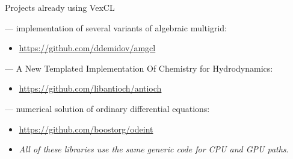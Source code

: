 \documentclass[@BEAMER_OPTIONS@]{beamer}
\begin{document}
\begin{frame}{Projects already using VexCL}
    \begin{description}[\quad]
        \item[AMGCL] --- implementation of several variants of algebraic
            multigrid:
            \begin{itemize}
                \item \href{https://github.com/ddemidov/amgcl}{https://github.com/ddemidov/amgcl}
            \end{itemize}
            \vspace{\baselineskip}
        \item[Antioch] --- A New Templated Implementation Of Chemistry for
            Hydrodynamics:
            \begin{itemize}
                \item \href{https://github.com/libantioch/antioch}{https://github.com/libantioch/antioch}
            \end{itemize}
            \vspace{\baselineskip}
        \item[Boost.odeint] --- numerical solution of ordinary differential
            equations:
            \begin{itemize}
                \item \href{https://github.com/boostorg/odeint}{https://github.com/boostorg/odeint}
            \end{itemize}
    \end{description}
    \vspace{\baselineskip}
    \begin{itemize}
        \item \emph{All of these libraries use the same generic code for CPU
            and GPU paths}.
    \end{itemize}
\end{frame}

\note{ }
\end{document}
